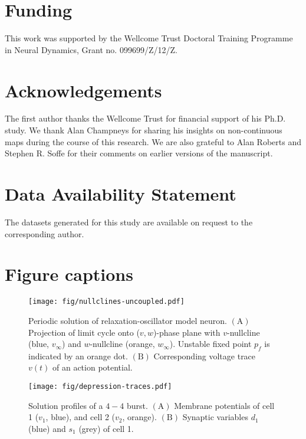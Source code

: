 \documentclass[utf8]{frontiersFPHY} %
\begin{document}
\section*{Funding}
This work was supported by the Wellcome Trust Doctoral Training Programme in Neural Dynamics, Grant no. 099699/Z/12/Z.

\section*{Acknowledgements}
The first author thanks the Wellcome Trust for financial support of his Ph.D. study.
We thank Alan Champneys for sharing his insights on non-continuous maps during the course of this research.
We are also grateful to Alan Roberts and Stephen R. Soffe for their comments on earlier versions of the manuscript.

\section*{Data Availability Statement}
The datasets generated for this study are available on request to the corresponding author.




\section*{Figure captions}

\begin{figure}[h!]
  \centering
  \texttt{[image: fig/nullclines-uncoupled.pdf]}
  \caption{Periodic solution of relaxation-oscillator model neuron. $\bm{\mathrm{(A)}}$ Projection of limit cycle onto ($v,w$)-phase plane with $v$-nullcline (blue, $v_\infty$) and $w$-nullcline (orange, $w_\infty$). Unstable fixed point $p_{f}$ is indicated by an orange dot. $\bm{\mathrm{(B)}}$ Corresponding voltage trace $v(t)$ of an action potential.~\label{fig:nullclines}}
\end{figure}

\begin{figure}[h!]
  \centering
  \texttt{[image: fig/depression-traces.pdf]}
  \caption{Solution profiles of a $4-4$ burst. $\bm{\mathrm{(A)}}$ Membrane potentials of cell 1 ($v_{1}$, blue), and cell 2 ($v_{2}$, orange). $\bm{\mathrm{(B)}}$ Synaptic variables $d_{1}$ (blue) and $s_{1}$ (grey) of cell 1.~\label{fig:depression-traces}}
\end{figure}
\end{document}

